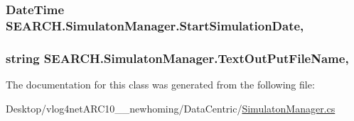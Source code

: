 \hypertarget{class_s_e_a_r_c_h_1_1_simulaton_manager_a97422d3d9b72cfc76e05f55f903d9833}{
\subsubsection[{Start\-Simulation\-Date}]{\setlength{\rightskip}{0pt plus 5cm}Date\-Time S\-E\-A\-R\-C\-H.\-Simulaton\-Manager.\-Start\-Simulation\-Date\hspace{0.3cm}{\ttfamily [get]}, {\ttfamily [set]}}}\label{class_s_e_a_r_c_h_1_1_simulaton_manager_a97422d3d9b72cfc76e05f55f903d9833}
\hypertarget{class_s_e_a_r_c_h_1_1_simulaton_manager_a98b5aed35f8e2da23b5b099487e0a57c}{
\subsubsection[{Text\-Out\-Put\-File\-Name}]{\setlength{\rightskip}{0pt plus 5cm}string S\-E\-A\-R\-C\-H.\-Simulaton\-Manager.\-Text\-Out\-Put\-File\-Name\hspace{0.3cm}{\ttfamily [get]}, {\ttfamily [set]}}}\label{class_s_e_a_r_c_h_1_1_simulaton_manager_a98b5aed35f8e2da23b5b099487e0a57c}


The documentation for this class was generated from the following file\-:\begin{DoxyCompactItemize}
\item 
Desktop/vlog4net\-A\-R\-C10\-\_\-\_\-newhoming/\-Data\-Centric/\hyperlink{_simulaton_manager_8cs}{Simulaton\-Manager.\-cs}\end{DoxyCompactItemize}
